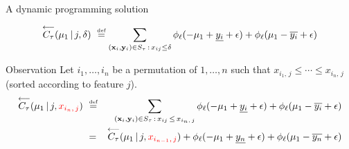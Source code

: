 \documentclass{beamer}
\newcommand{\ylower}[1]{\ensuremath{\underline{y_{#1}}}}
\newcommand{\yupper}[1]{\ensuremath{\overline{y_{#1}}}}
\begin{document}
\begin{frame}{A dynamic programming solution}
	\vspace{-3mm}

	\begin{equation*}
	\overset{\longleftarrow}{C_{\tau}}(\mu_1 \,|\, j, \delta) \ \eqdef \sum_{(\xb_i, \yb_i) \in S_{\tau}\,:\,x_{ij} \leq \delta} \phi_\ell(-\mu_1 + \ylower{i} + \epsilon) + \phi_\ell(\mu_1 - \yupper{i} + \epsilon) 
	\end{equation*}
	
	\begin{block}{Observation}
          Let $i_1,\dots,i_n$ be a permutation of $1,\dots,n$ such
          that $x_{i_1,\, j} \leq \cdots \leq x_{i_n,\, j}$ (sorted
          according to feature $j$).
\begin{eqnarray*}
  \overset{\longleftarrow}{C_{\tau}}(\mu_1 \,|\, j, \red{x_{i_n,\, j}}) \ & \eqdef & \sum_{(\xb_i, \yb_i) \in S_{\tau}\,:\,x_{ij} \,\leq\, x_{i_n,\, j}} \phi_\ell(-\mu_1 + \ylower{i} + \epsilon) + \phi_\ell(\mu_1 - \yupper{i} + \epsilon) \\
		&=& \overset{\longleftarrow}{C_{\tau}}(\mu_1 \,|\, j, \red{x_{i_{n-1},\, j}}) +  \phi_\ell(-\mu_1 + \ylower{n} + \epsilon) + \phi_\ell(\mu_1 - \yupper{n} + \epsilon)
		\end{eqnarray*}
	\end{block}
	
%		
\end{frame}
\end{document}
